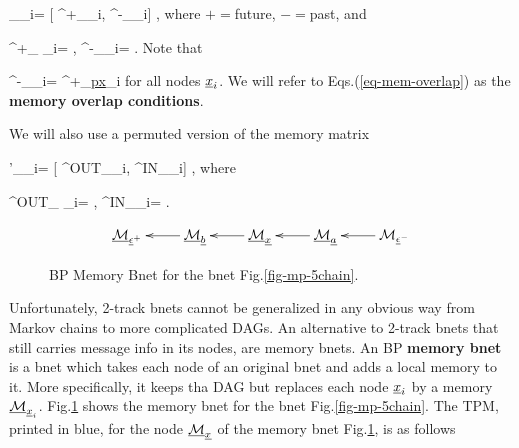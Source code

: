 \beq
\calm_{\rvx_i}=
[
\calm^+_{\rvx_i},
\calm^-_{\rvx_i}]
\;,
\eeq
where $+=$future, $-=$past, and 

\beq
\calm^+_{ \rvx_i}=
\;, 
\;\;\;
\calm^-_{\rvx_i}=
\;.
\eeq 
Note that

\beq
\calm^-_{\rvx_i}=
\calm^+_{\ul{px}_i}
\label{eq-mem-overlap}
\eeq
for all nodes ${\underline{x}}_i$.
We will refer to
Eqs.(\ref{eq-mem-overlap}) as
the {\bf memory overlap
conditions}.

We will also use a permuted version of the 
memory matrix

\beq
\calm'_{\rvx_i}=
[
\calm^{OUT}_{\rvx_i},
\calm^{IN}_{\rvx_i}]
\;,
\eeq
where

\beq
\calm^{OUT}_{ \rvx_i}=
\;, 
\;\;\;
\calm^{IN}_{\rvx_i}=
\;.
\eeq

\begin{figure}[h!]
$$\xymatrix{
\ucalm_{\rveps^+}
&
\ucalm_\rvb\ar[l]
&
\ucalm_\rvx\ar[l]
&
\ucalm_\rva\ar[l]
&
\calm_{\rveps^-}\ar[l]
}$$
\caption{BP Memory Bnet for the bnet
Fig.\ref{fig-mp-5chain}. }
\label{fig-mem-5chain}
\end{figure}

Unfortunately,
2-track bnets cannot be
 generalized in any
obvious way  from 
Markov chains to more
complicated DAGs.
An alternative to 2-track bnets
that still
carries message
info in its nodes,
are memory bnets. An BP
{\bf memory bnet}
is a bnet 
which takes each node
of an original
bnet and
adds a local memory to it.
More specifically,
it keeps tha DAG
but replaces each node
${\underline{x}}_i$
by a memory $\underline{{\cal M}}_{{\underline{x}}_i}$.
Fig.\ref{fig-mem-5chain} shows 
the memory bnet for
the bnet Fig.\ref{fig-mp-5chain}.
The TPM, printed in blue,
for the  node $\underline{{\cal M}}_{\underline{x}}$
of the memory bnet 
Fig.\ref{fig-mem-5chain}, is as follows

